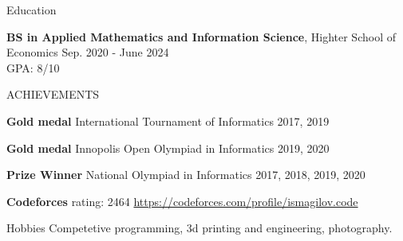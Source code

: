 \documentclass{resume} %
\begin{document}
\begin{rSection}{Education}

    {\bf BS in Applied Mathematics and Information Science}, Highter School of Economics \hfill {Sep. 2020 - June 2024}\\
GPA: 8/10 
\end{rSection}

\begin{rSection}{ACHIEVEMENTS}
\vspace{-1.25em}
\item \textbf{Gold medal} {International Tournament of Informatics} \hfill 2017, 2019 
\item \textbf{Gold medal} {Innopolis Open Olympiad in Informatics} \hfill 2019, 2020 
\item \textbf{Prize Winner} {National Olympiad in Informatics} \hfill 2017, 2018, 2019, 2020 
\item \textbf{Codeforces} {rating: 2464} \hfill \url{https://codeforces.com/profile/ismagilov.code} 
\end{rSection} 

\begin{rSection}{Hobbies}
    Competetive programming, 3d printing and engineering, photography.
\end{rSection}
\end{document}
